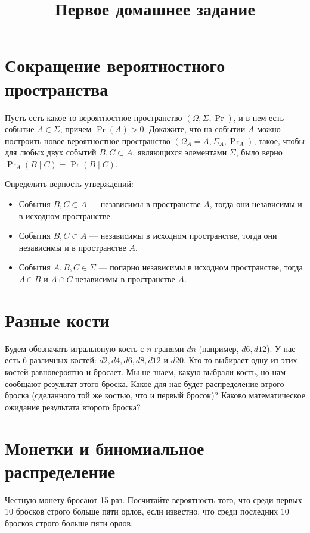 \documentclass[12pt]{article}
\title{Первое домашнее задание}
\begin{document}
\maketitle

\section{Сокращение вероятностного пространства}

Пусть есть какое-то вероятностное пространство $(\Omega, \Sigma, \Pr)$, и в нем есть событие $A \in \Sigma$, причем $\Pr(A) > 0$. Докажите, что на событии $A$ можно построить новое вероятностное пространство $(\Omega_A = A, \Sigma_A, \Pr_A)$, такое, чтобы для любых двух событий $B, C \subset A$, являющихся элементами $\Sigma$, было верно $\Pr_A(B \mid C) = \Pr(B \mid C)$.

Определить верность утверждений:
\begin{itemize}
    \item События $B, C \subset A$ --- независимы в пространстве $A$, тогда они независимы и в исходном пространстве.
    \item События $B, C \subset A$ --- независимы в исходном пространстве, тогда они независимы и в пространстве $A$.
    \item События $A, B, C \in \Sigma$ --- попарно независимы в исходном пространстве, тогда $A \cap B$ и $A \cap C$ независимы в пространстве $A$.
\end{itemize}  

\section{Разные кости}

Будем обозначать игральюную кость с $n$ гранями $dn$ (например, $d6, d12$). У нас есть 6 различных костей: $d2, d4, d6, d8, d12$ и $d20$. Кто-то выбирает одну из этих костей равновероятно и бросает. Мы не знаем, какую выбрали кость, но нам сообщают результат этого броска. Какое для нас будет распределение втрого броска (сделанного той же костью, что и первый бросок)? Каково математическое ожидание результата второго броска?

\section{Монетки и биномиальное распределение}

Честную монету бросают 15 раз. Посчитайте вероятность того, что среди первых 10 бросков строго больше пяти орлов, если известно, что среди последних 10 бросков строго больше пяти орлов.
\end{document}
